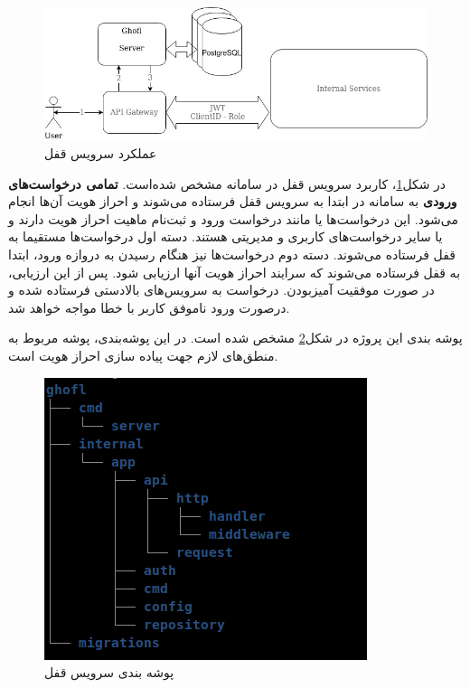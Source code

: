 \begin{figure}
	\vspace{1cm}
	\centering
	\includegraphics[scale=0.5]{figures/30bird-ghofl.jpg}
	\caption{عملکرد سرویس قفل}
	\label{fig:30bird-ghofl}
\end{figure}

در شکل\ref{fig:30bird-ghofl}، کاربرد سرویس قفل در سامانه مشخص شده‌است. \textbf{تمامی درخواست‌های ورودی} به سامانه در ابتدا به سرویس قفل فرستاده می‌شوند و احراز هویت آن‌ها انجام می‌شود. این درخواست‌ها یا مانند درخواست ورود و ثبت‌نام ماهیت احراز هویت دارند و یا سایر درخواست‌های کاربری و مدیریتی هستند. دسته اول درخواست‌ها مستقیما به قفل فرستاده می‌شوند. دسته دوم درخواست‌ها نیز هنگام رسیدن به دروازه ‌ورود، ابتدا به قفل فرستاده می‌شوند که سرایند احراز هویت  آنها ارزیابی شود. پس از این ارزیابی، در صورت موفقیت آمیز‌بودن. درخواست به سرویس‌های بالادستی فرستاده شده و درصورت ورود ناموفق کاربر با خطا مواجه خواهد شد.


پوشه بندی این پروژه در شکل\ref{fig:30bird-ghofl-dir} مشخص شده است. 
در این پوشه‌بندی، پوشه  مربوط به منطق‌های لازم جهت پیاده سازی احراز هویت است. 

\begin{figure}
	\vspace{1cm}
	\centering
	\includegraphics[scale=0.5]{figures/ghofl-dir.png}
	\caption{پوشه بندی سرویس قفل}
	\label{fig:30bird-ghofl-dir}
\end{figure}

